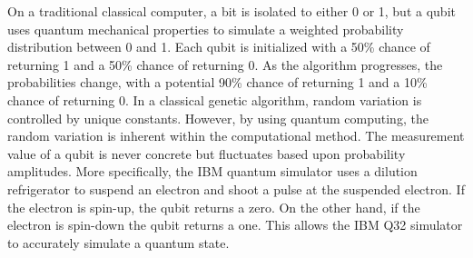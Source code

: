 On a traditional classical computer, a bit is isolated to either 0 or 1, but a qubit uses quantum mechanical properties to simulate a weighted probability distribution between 0 and 1. Each qubit is initialized with a 50\% chance of returning 1 and a 50\% chance of returning 0. As the algorithm progresses, the probabilities change, with a potential 90\% chance of returning 1 and a 10\% chance of returning 0. In a classical genetic algorithm, random variation is controlled by unique constants. However, by using quantum computing, the random variation is inherent within the computational method. The measurement value of a qubit is never concrete but fluctuates based upon probability amplitudes. More specifically, the IBM quantum simulator uses a dilution refrigerator to suspend an electron and shoot a pulse at the suspended electron. If the electron is spin-up, the qubit returns a zero. On the other hand, if the electron is spin-down the qubit returns a one. This allows the IBM Q32 simulator to accurately simulate a quantum state.








